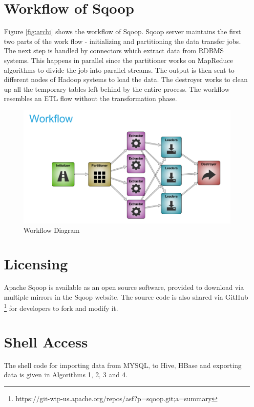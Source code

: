 \documentclass[9pt,twocolumn,twoside]{../../styles/osajnl}
\begin{document}
\section{Workflow of Sqoop}
Figure \ref{fig:archi} shows the workflow of Sqoop. Sqoop server maintains the first two parts of the work flow -  initializing and partitioning the data transfer jobs. The next step is handled by connectors which extract data from RDBMS systems. This happens in parallel since the partitioner works on MapReduce algorithms to divide the job into parallel streams. The output is then sent to different nodes of Hadoop systems to load the data. The destroyer works to clean up all the temporary tables left behind by the entire process. The workflow resembles an ETL flow without the transformation phase.

\begin{figure}[htbp]
\centering
\includegraphics[width=\linewidth]{images/work.png}
\caption{Workflow Diagram \cite{sqoop-blog}}
\label{fig:work}
\end{figure}
\section{Licensing}
Apache Sqoop is available as an open source software, provided to download via multiple mirrors in the Sqoop website\cite{down}. The source code is also shared via GitHub \footnote{https://git-wip-us.apache.org/repos/asf?p=sqoop.git;a=summary} for developers to fork and modify it. 

\section{Shell Access}
The shell code for importing data from MYSQL, to Hive, HBase and exporting data is given in Algorithms 1, 2, 3 and 4\cite{cloudera}.
\end{document}
